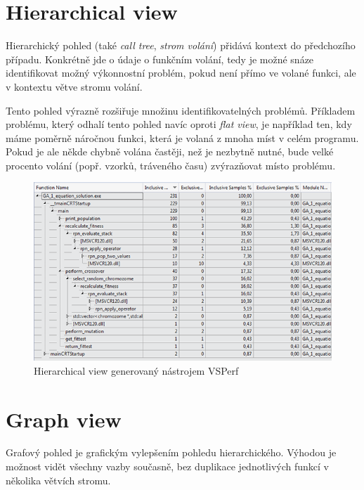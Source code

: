 \documentclass[czech,BP]{thesiskiv}
\begin{document}
\newpage

\section{Hierarchical view}

Hierarchický pohled (také \emph{call tree}, \emph{strom volání}) přidává kontext do předchozího případu. Konkrétně jde o údaje o funkčním volání, tedy je možné snáze identifikovat možný výkonnostní problém, pokud není přímo ve volané funkci, ale v kontextu větve stromu volání.

Tento pohled výrazně rozšiřuje množinu identifikovatelných problémů. Příkladem problému, který odhalí tento pohled navíc oproti \emph{flat view}, je například ten, kdy máme poměrně náročnou funkci, která je volaná z mnoha míst v celém programu. Pokud je ale někde chybně volána častěji, než je nezbytně nutné, bude velké procento volání (popř. vzorků, tráveného času) zvýrazňovat místo problému.

\begin{figure}[h]
    \centering
    \includegraphics[interpolate,width=1.0\textwidth]{img/prof_calltree.png}
    \caption{Hierarchical view generovaný nástrojem VSPerf}
    \label{obr:hieview}
\end{figure}

\section{Graph view}

Grafový pohled je grafickým vylepšením pohledu hierarchického. Výhodou je možnost vidět všechny vazby současně, bez duplikace jednotlivých funkcí v několika větvích stromu.
\end{document}
